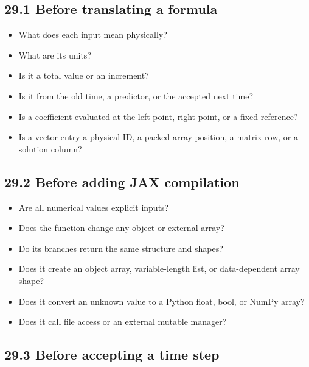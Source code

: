 \documentclass[11pt,a4paper]{article}
\begin{document}
\subsection{29.1 Before translating a formula}

\begin{itemize}
\item What does each input mean physically?


\item What are its units?


\item Is it a total value or an increment?


\item Is it from the old time, a predictor, or the accepted next time?


\item Is a coefficient evaluated at the left point, right point, or a fixed reference?


\item Is a vector entry a physical ID, a packed-array position, a matrix row, or a solution column?


\end{itemize}
\subsection{29.2 Before adding JAX compilation}

\begin{itemize}
\item Are all numerical values explicit inputs?


\item Does the function change any object or external array?


\item Do its branches return the same structure and shapes?


\item Does it create an object array, variable-length list, or data-dependent array shape?


\item Does it convert an unknown value to a Python float, bool, or NumPy array?


\item Does it call file access or an external mutable manager?


\end{itemize}
\subsection{29.3 Before accepting a time step}
\end{document}
